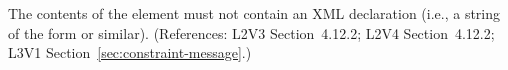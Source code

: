 The contents of the  element must not contain an XML
declaration (i.e., a string of the form  or similar).  (References: L2V3
Section~4.12.2; L2V4 Section~4.12.2; L3V1 Section~\ref{sec:constraint-message}.)
